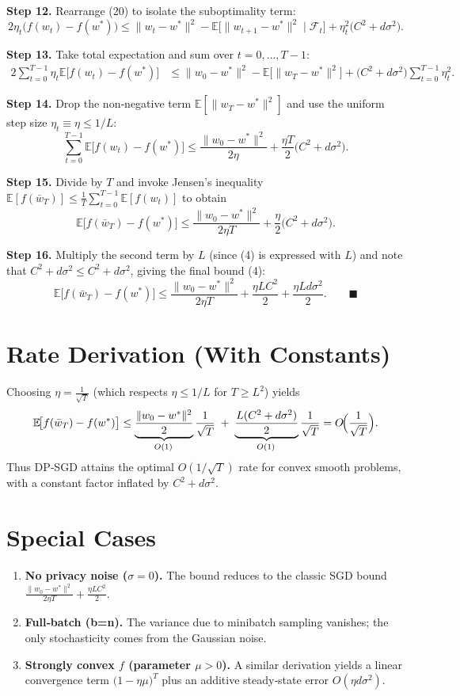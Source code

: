 \documentclass{article}
\newcommand{\EE}{\mathbb{E}}
\begin{document}
\noindent\textbf{Step 12.} Rearrange (20) to isolate the suboptimality term:
\[
2\eta_t\bigl(f(w_t)-f(w^{*})\bigr)
\le \|w_t-w^{*}\|^{2}-\EE\!\bigl[\|w_{t+1}-w^{*}\|^{2}\mid\mathcal{F}_t\bigr]
+\eta_t^{2}\bigl(C^{2}+d\sigma^{2}\bigr).
\tag{21}
\]

\noindent\textbf{Step 13.} Take total expectation and sum over $t=0,\dots,T-1$:
\[
\begin{aligned}
2\sum_{t=0}^{T-1}\eta_t\EE\!\bigl[f(w_t)-f(w^{*})\bigr]
&\le \|w_0-w^{*}\|^{2}
-\EE\!\bigl[\|w_T-w^{*}\|^{2}\bigr]
+\bigl(C^{2}+d\sigma^{2}\bigr)\sum_{t=0}^{T-1}\eta_t^{2}.
\end{aligned}
\tag{22}
\]

\noindent\textbf{Step 14.} Drop the non‑negative term $\EE[\|w_T-w^{*}\|^{2}]$ and use the
uniform step size $\eta_t\equiv\eta\le 1/L$:
\[
\sum_{t=0}^{T-1}\EE\!\bigl[f(w_t)-f(w^{*})\bigr]
\le \frac{\|w_0-w^{*}\|^{2}}{2\eta}
+\frac{\eta T}{2}\bigl(C^{2}+d\sigma^{2}\bigr).
\tag{23}
\]

\noindent\textbf{Step 15.} Divide by $T$ and invoke Jensen’s inequality
$\EE[f(\bar w_T)]\le\frac1T\sum_{t=0}^{T-1}\EE[f(w_t)]$ to obtain
\[
\EE\!\bigl[f(\bar w_T)-f(w^{*})\bigr]
\le \frac{\|w_0-w^{*}\|^{2}}{2\eta T}
+\frac{\eta}{2}\bigl(C^{2}+d\sigma^{2}\bigr).
\tag{24}
\]

\noindent\textbf{Step 16.} Multiply the second term by $L$ (since (4) is expressed with $L$)
and note that $C^{2}+d\sigma^{2}\le C^{2}+d\sigma^{2}$, giving the final bound (4):
\[
\EE\!\bigl[f(\bar w_T)-f(w^{*})\bigr]
\le \frac{\|w_0-w^{*}\|^{2}}{2\eta T}
+\frac{\eta L C^{2}}{2}
+\frac{\eta L d\sigma^{2}}{2}.
\qquad\blacksquare
\]

\section*{Rate Derivation (With Constants)}
Choosing $\eta = \frac{1}{\sqrt{T}}$ (which respects $\eta\le 1/L$ for $T\ge L^{2}$) yields
\[
\EE\!\bigl[f(\bar w_T)-f(w^{*})\bigr]
\le
\underbrace{\frac{\|w_0-w^{*}\|^{2}}{2}}_{\!O(1)}\frac{1}{\sqrt{T}}
\;+\;
\underbrace{\frac{L(C^{2}+d\sigma^{2})}{2}}_{\!O(1)}\frac{1}{\sqrt{T}}
=O\!\Bigl(\frac{1}{\sqrt{T}}\Bigr).
\]
Thus DP‑SGD attains the optimal $O(1/\sqrt{T})$ rate for convex smooth problems,
with a constant factor inflated by $C^{2}+d\sigma^{2}$.

\section*{Special Cases}
\begin{enumerate}
\item \textbf{No privacy noise ($\sigma=0$).} The bound reduces to the classic SGD bound
$\frac{\|w_0-w^{*}\|^{2}}{2\eta T}+\frac{\eta L C^{2}}{2}$.
\item \textbf{Full‑batch (b=n).} The variance due to minibatch sampling vanishes;
the only stochasticity comes from the Gaussian noise.
\item \textbf{Strongly convex $f$ (parameter $\mu>0$).}
A similar derivation yields a linear convergence term
$\bigl(1-\eta\mu\bigr)^{T}$ plus an additive steady‑state error
$O(\eta d\sigma^{2})$.
\end{enumerate}
\end{document}
